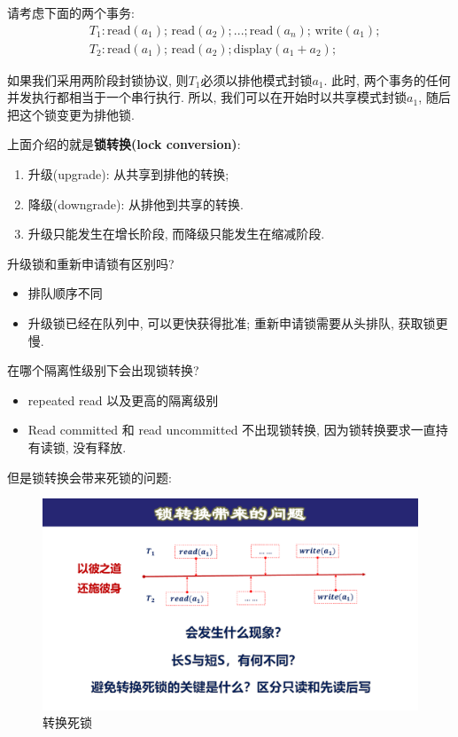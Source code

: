 请考虑下面的两个事务:
\begin{align*}
    &T_1: \text{read}(a_1);\,\text{read}(a_2);...;\text{read}(a_n);\,\text{write}(a_1); \\
    &T_2: \text{read}(a_1);\,\text{read}(a_2);\text{display}(a_1+a_2);
\end{align*}

如果我们采用两阶段封锁协议, 则$T_1$必须以排他模式封锁$a_1$. 此时, 两个事务的任何并发执行都相当于一个串行执行. 所以, 我们可以在开始时以共享模式封锁$a_1$, 随后把这个锁变更为排他锁.

上面介绍的就是\textbf{锁转换(lock conversion)}:
\begin{enumerate}
    \item 升级(upgrade): 从共享到排他的转换;
    \item 降级(downgrade): 从排他到共享的转换.
    \item 升级只能发生在增长阶段, 而降级只能发生在缩减阶段.
\end{enumerate}

\begin{problem}
  升级锁和重新申请锁有区别吗?
\end{problem}

\begin{itemize}
  \item 排队顺序不同
  \item 升级锁已经在队列中, 可以更快获得批准; 重新申请锁需要从头排队, 获取锁更慢.
\end{itemize}

\begin{problem}
  在哪个隔离性级别下会出现锁转换?
\end{problem}
\begin{itemize}
  \item repeated read 以及更高的隔离级别
  \item Read committed 和 read uncommitted 不出现锁转换, 因为锁转换要求一直持有读锁, 没有释放.
\end{itemize}

但是锁转换会带来死锁的问题: 
\begin{figure}[H]
    \centering
    \includegraphics[width=.6\textwidth]{figure/并发控制-锁转换.pdf}
    \caption{转换死锁}
\end{figure}

